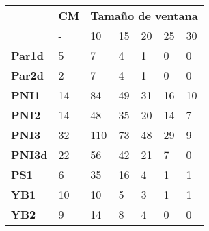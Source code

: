 \begin{table}[]
\begin{tabular}{l|l|lllll|}
\cline{2-7}
\multirow{2}{*}{}                    & \textbf{CM} & \multicolumn{5}{l|}{\textbf{Tamaño de ventana}}                                                                             \\ \cline{3-7} 
                                     & -           & \multicolumn{1}{l|}{10}     & \multicolumn{1}{l|}{15}     & \multicolumn{1}{l|}{20}    & \multicolumn{1}{l|}{25}    & 30    \\ \hline
\multicolumn{1}{|l|}{\textbf{Par1d}} & 5           & \multicolumn{1}{l|}{7}      & \multicolumn{1}{l|}{4}      & \multicolumn{1}{l|}{1}     & \multicolumn{1}{l|}{0}     & 0     \\ \hline
\multicolumn{1}{|l|}{\textbf{Par2d}} & 2           & \multicolumn{1}{l|}{7}      & \multicolumn{1}{l|}{4}      & \multicolumn{1}{l|}{1}     & \multicolumn{1}{l|}{0}     & 0     \\ \hline
\multicolumn{1}{|l|}{\textbf{PNI1}}  & 14          & \multicolumn{1}{l|}{84}     & \multicolumn{1}{l|}{49}     & \multicolumn{1}{l|}{31}    & \multicolumn{1}{l|}{16}    & 10    \\ \hline
\multicolumn{1}{|l|}{\textbf{PNI2}}  & 14          & \multicolumn{1}{l|}{48}     & \multicolumn{1}{l|}{35}     & \multicolumn{1}{l|}{20}    & \multicolumn{1}{l|}{14}    & 7     \\ \hline
\multicolumn{1}{|l|}{\textbf{PNI3}}  & 32          & \multicolumn{1}{l|}{110}    & \multicolumn{1}{l|}{73}     & \multicolumn{1}{l|}{48}    & \multicolumn{1}{l|}{29}    & 9     \\ \hline
\multicolumn{1}{|l|}{\textbf{PNI3d}} & 22          & \multicolumn{1}{l|}{56}     & \multicolumn{1}{l|}{42}     & \multicolumn{1}{l|}{21}    & \multicolumn{1}{l|}{7}     & 0     \\ \hline
\multicolumn{1}{|l|}{\textbf{PS1}}   & 6           & \multicolumn{1}{l|}{35}     & \multicolumn{1}{l|}{16}     & \multicolumn{1}{l|}{4}     & \multicolumn{1}{l|}{1}     & 1     \\ \hline
\multicolumn{1}{|l|}{\textbf{YB1}}   & 10          & \multicolumn{1}{l|}{10}     & \multicolumn{1}{l|}{5}      & \multicolumn{1}{l|}{3}     & \multicolumn{1}{l|}{1}     & 1     \\ \hline
\multicolumn{1}{|l|}{\textbf{YB2}}   & 9           & \multicolumn{1}{l|}{14}     & \multicolumn{1}{l|}{8}      & \multicolumn{1}{l|}{4}     & \multicolumn{1}{l|}{0}     & 0     \\ \hline

\end{tabular}
\end{table}
